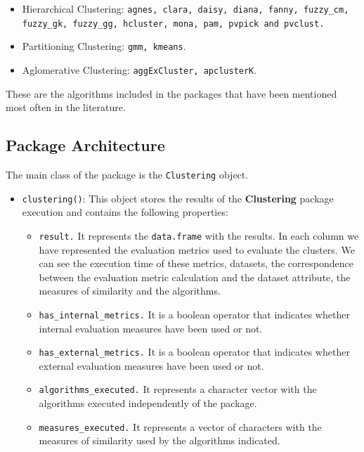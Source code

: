 \documentclass[
]{article}
\providecommand{\tightlist}{%
  \setlength{\itemsep}{0pt}\setlength{\parskip}{0pt}}
\begin{document}
\begin{itemize}
\tightlist
\item
  Hierarchical Clustering:
  \texttt{agnes, clara, daisy, diana, fanny, fuzzy\_cm, fuzzy\_gk, fuzzy\_gg, hcluster, mona, pam, pvpick and pvclust.}
\item
  Partitioning Clustering: \texttt{gmm, kmeans}.
\item
  Aglomerative Clustering: \texttt{aggExCluster, apclusterK}.
\end{itemize}

These are the algorithms included in the packages that have been
mentioned most often in the literature.

\hypertarget{package-architecture}{%
\subsection{Package Architecture}\label{package-architecture}}

The main class of the package is the \texttt{Clustering} object.

\begin{itemize}
\tightlist
\item
  \texttt{clustering()}: This object stores the results of the
  \textbf{Clustering} package execution and contains the following
  properties:

  \begin{itemize}
  \tightlist
  \item
    \texttt{result.} It represents the \texttt{data.frame} with the
    results. In each column we have represented the evaluation metrics
    used to evaluate the clusters. We can see the execution time of
    these metrics, datasets, the correspondence between the evaluation
    metric calculation and the dataset attribute, the measures of
    similarity and the algorithms.
  \item
    \texttt{has\_internal\_metrics.} It is a boolean operator that
    indicates whether internal evaluation measures have been used or
    not.
  \item
    \texttt{has\_external\_metrics.} It is a boolean operator that
    indicates whether external evaluation measures have been used or
    not.
  \item
    \texttt{algorithms\_executed.} It represents a character vector with
    the algorithms executed independently of the package.
  \item
    \texttt{measures\_executed.} It represents a vector of characters
    with the measures of similarity used by the algorithms indicated.
  \end{itemize}
\end{itemize}
\end{document}
